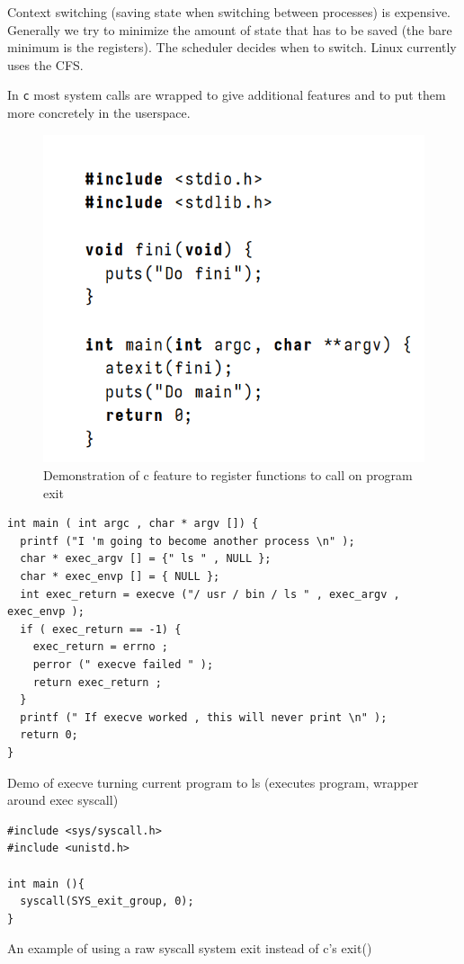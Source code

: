 \documentclass[../notes.tex]{subfiles}
\begin{document}
Context switching (saving state when switching between processes) is expensive. Generally we try to minimize the amount of state that has to be saved (the bare minimum is the registers).
The scheduler decides when to switch. Linux currently uses the CFS.


In \texttt{c} most system calls are wrapped to give additional features and to put them more concretely in the userspace.


\begin{figure}[H]
  \centering
  \includegraphics[width=0.8\linewidth]{img/image_2023-01-12-15-34-58.png}
  \caption{Demonstration of c feature to register functions to call on program exit}
\end{figure}

\begin{listing}[H]
\begin{verbatim}
int main ( int argc , char * argv []) {
  printf ("I 'm going to become another process \n" );
  char * exec_argv [] = {" ls " , NULL };
  char * exec_envp [] = { NULL };
  int exec_return = execve ("/ usr / bin / ls " , exec_argv , exec_envp );
  if ( exec_return == -1) {
    exec_return = errno ;
    perror (" execve failed " );
    return exec_return ;
  }
  printf (" If execve worked , this will never print \n" );
  return 0;
}
\end{verbatim}
\caption{Demo of execve turning current program to ls (executes program, wrapper around exec syscall)}
\end{listing}

\begin{listing}[H]
\begin{verbatim}
#include <sys/syscall.h>
#include <unistd.h>

int main (){
  syscall(SYS_exit_group, 0);
}

\end{verbatim}
\caption{An example of using a raw syscall system exit instead of c's exit()}
\end{listing}
\end{document}
